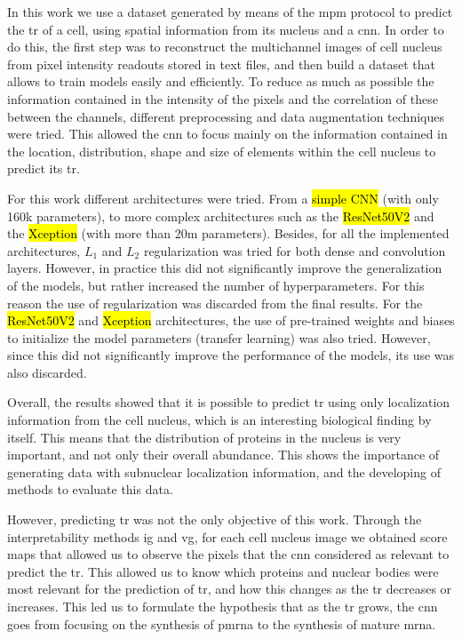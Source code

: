 
\glsresetall

In this work we use a dataset generated by means of the \gls{mpm} protocol to predict the \gls{tr} of a cell, using spatial information from its nucleus and a \gls{cnn}. In order to do this, the first step was to reconstruct the multichannel images of cell nucleus from pixel intensity readouts stored in text files, and then build a dataset that allows to train models easily and efficiently.
To reduce as much as possible the information contained in the intensity of the pixels and the correlation of these between the channels, different preprocessing and data augmentation techniques were tried. This allowed the \gls{cnn} to focus mainly on the information contained in the location, distribution, shape and size of elements within the cell nucleus to predict its \gls{tr}.

For this work different architectures were tried. From a \hl{simple CNN} (with only 160k parameters), to more complex architectures such as the \hl{ResNet50V2} and the \hl{Xception} (with more than 20m parameters).
Besides, for all the implemented architectures, $L_1$ and $L_2$ regularization was tried for both dense and convolution layers. However, in practice this did not significantly improve the generalization of the models, but rather increased the number of hyperparameters. For this reason the use of regularization was discarded from the final results.
For the \hl{ResNet50V2} and \hl{Xception} architectures, the use of pre-trained weights and biases to initialize the model parameters (transfer learning) was also tried. However, since this did not significantly improve the performance of the models, its use was also discarded.

Overall, the results showed that it is possible to predict \gls{tr} using only localization information from the cell nucleus, which is an interesting biological finding by itself.
This means that the distribution of proteins in the nucleus is very important, and not only their overall abundance. This shows the importance of generating data with subnuclear localization information, and the developing of methods to evaluate this data.

However, predicting \gls{tr} was not the only objective of this work.
Through the interpretability methods \gls{ig} and \gls{vg}, for each cell nucleus image we obtained score maps that allowed us to observe the pixels that the \gls{cnn} considered as relevant to predict the \gls{tr}.
This allowed us to know which proteins and nuclear bodies were most relevant for the prediction of \gls{tr}, and how this changes as the \gls{tr} decreases or increases.
This led us to formulate the hypothesis that as the \gls{tr} grows, the \gls{cnn} goes from focusing on the synthesis of \gls{pmrna} to the synthesis of mature \gls{mrna}.

